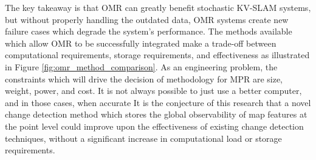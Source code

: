 The key takeaway is that OMR can greatly benefit stochastic KV-SLAM systems, but without properly handling the outdated data, OMR systems create new failure cases which degrade the system's performance. The methods available which allow OMR to be successfully integrated make a trade-off between computational requirements, storage requirements, and effectiveness as illustrated in Figure \ref{fig:omr_method_comparison}. As an engineering problem, the constraints which will drive the decision of methodology for MPR are size, weight, power, and cost. It is not always possible to just use a better computer, and in those cases, when accurate  It is the conjecture of this research that a novel change detection method which stores the global observability of map features at the point level could improve upon the effectiveness of existing change detection techniques, without a significant increase in computational load or storage requirements.